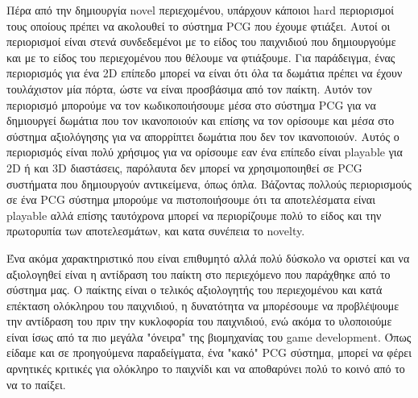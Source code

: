 Πέρα από την δημιουργία novel περιεχομένου, υπάρχουν κάποιοι hard περιορισμοί τους οποίους πρέπει να ακολουθεί το σύστημα PCG που έχουμε φτιάξει. Αυτοί οι περιορισμοί είναι στενά συνδεδεμένοι με το είδος του παιχνιδιού που δημιουργούμε και με το είδος του περιεχομένου που θέλουμε να φτιάξουμε. Για παράδειγμα, ένας περιορισμός για ένα 2D επίπεδο μπορεί να είναι ότι όλα τα δωμάτια πρέπει να έχουν τουλάχιστον μία πόρτα, ώστε να είναι προσβάσιμα από τον παίκτη. Αυτόν τον περιορισμό μπορούμε να τον κωδικοποιήσουμε μέσα στο σύστημα PCG για να δημιουργεί δωμάτια που τον ικανοποιούν και επίσης να τον ορίσουμε και μέσα στο σύστημα αξιολόγησης για να απορρίπτει δωμάτια που δεν τον ικανοποιούν. Αυτός ο περιορισμός είναι πολύ χρήσιμος για να ορίσουμε εαν ένα επίπεδο είναι playable για 2D ή και 3D διαστάσεις, παρόλαυτα δεν μπορεί να χρησιμοποιηθεί σε PCG συστήματα που δημιουργούν αντικείμενα, όπως όπλα. Βάζοντας πολλούς περιορισμούς σε ένα PCG σύστημα μπορούμε να πιστοποιήσουμε ότι τα αποτελέσματα είναι playable αλλά επίσης ταυτόχρονα μπορεί να περιορίζουμε πολύ το είδος και την πρωτορυπία των αποτελεσμάτων, και κατα συνέπεια το novelty.
\par
Ένα ακόμα χαρακτηριστικό που είναι επιθυμητό αλλά πολύ δύσκολο να οριστεί και να αξιολογηθεί είναι η αντίδραση του παίκτη στο περιεχόμενο που παράχθηκε από το σύστημα μας. Ο παίκτης είναι ο τελικός αξιολογητής του περιεχομένου και κατά επέκταση ολόκληρου του παιχνιδιού, η δυνατότητα να μπορέσουμε να προβλέψουμε την αντίδραση του πριν την κυκλοφορία του παιχνιδιού, ενώ ακόμα το υλοποιούμε είναι ίσως από τα πιο μεγάλα "όνειρα" της βιομηχανίας του game development. Όπως είδαμε και σε προηγούμενα παραδείγματα, ένα "κακό" PCG σύστημα, μπορεί να φέρει αρνητικές κριτικές για ολόκληρο το παιχνίδι και να αποθαρύνει πολύ το κοινό από το να το παίξει. 








